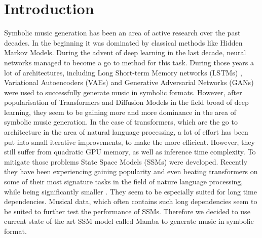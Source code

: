 \documentclass[conference,compsoc]{IEEEtran}
\begin{document}
%
\IEEEpeerreviewmaketitle



\section{Introduction}
Symbolic music generation has been an area of active research over the past decades. In the beginning it was dominated by classical methods like Hidden Markov Models. During the advent of deep learning in the last decade, neural networks managed to become a go to method for this task. During those years a lot of architectures, including Long Short-term Memory networks (LSTMs) \cite{lstm}, Variational Autoencoders (VAEs) \cite{kingma2022autoencoding} and Generative Adversarial Networks (GANs) \cite{goodfellow2014generative} were used to successfully generate music in symbolic formats. However, after popularisation of Transformers \cite{attention-is-all-you-need} and Diffusion Models \cite{ho2020denoising} in the field broad of deep learning, they seem to be gaining more and more dominance in the area of symbolic music generation.  In the case of transformers, which are the go to architecture in the area of natural language processing, a lot of effort has been put into small iterative improvements, to make the more efficient. However, they still suffer from quadratic GPU memory, as well as inference time complexity. To mitigate those problems State Space Models (SSMs) \cite{ssm} were developed.  Recently they have been experiencing gaining popularity and even beating transformers on some of their most signature tasks in the field of nature language processing, while being significantly smaller \cite{mamba}. They seem to be especially suited for long time dependencies. Musical data, which often contains such long dependencies seem to be suited to further test the performance of SSMs. Therefore we decided to use current state of the art SSM model called Mamba \cite{mamba} to generate music in symbolic format.



\end{document}
